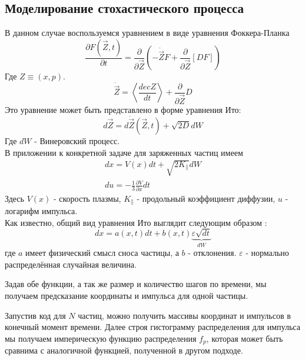 \documentclass[a4paper,14pt]{extarticle} %
\begin{document}
\subsection{Моделирование стохастического процесса}

В данном случае воспользуемся уравнением в виде уравнения Фоккера-Планка\cite{Krulls}
\begin{equation}
\frac{\partial F(\vec{Z}, t)}{\partial t} = \frac{\partial}{\partial \vec{Z}}\left( -\dot{\vec{Z}}F+\frac{\partial}{\partial\vec{Z}}[DF]  \right)
\end{equation}
Где $Z\equiv (x, p)$.
\begin{equation}
\dot{\vec{Z}} = \left< \frac{dec{Z}}{dt} \right> + \frac{\partial}{\partial\vec{Z}} D
\end{equation}
Это уравнение может быть представлено в форме уравнения Ито:
\begin{equation}
d\vec{Z} = d\dot{\vec{Z}}(\vec{Z}, t)+\sqrt{2D}dW
\end{equation}
Где $dW$ - Винеровский процесс.\\
В приложении к конкретной задаче для заряженных частиц имеем
\begin{eqnarray}
dx = V(x)dt+\sqrt{2K_{\parallel}}dW\\
du = - \frac{1}{3} \frac{\partial V}{\partial x} dt
\end{eqnarray}
Здесь $V(x)$ - скорость плазмы, $K_\parallel$ - продольный коэффициент диффузии, $u$ - логарифм импульса.\\
Как известно, общий вид уравнения Ито выглядит следующим образом\cite{Ito} :
\begin{equation}
dx = a(x, t)dt + b(x,t) \underbrace{\varepsilon \sqrt{dt}}_{dW}
\end{equation}
где $a$ имеет физический смысл сноса частицы, а $b$ - отклонения. $\varepsilon$ - нормально распределённая случайная величина.

Задав обе функции, а так же размер и количество шагов по времени, мы получаем предсказание координаты и импульса для одной частицы.

Запустив код для $N$ частиц, можно получить массивы координат и импульсов в конечный момент времени. Далее строя гистограмму распределения для импульса мы получаем империческую функцию распределения $f_p$, которая может быть сравнима с аналогичной функцией, полученной в другом подходе.
\end{document}
